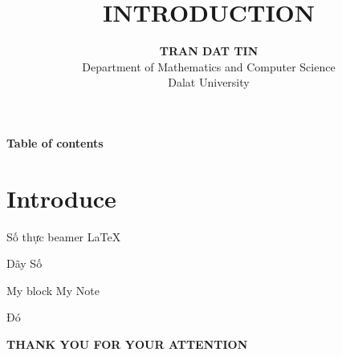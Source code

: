 \documentclass{beamer}
\title[]{\bf INTRODUCTION}
\author{\textbf{ TRAN DAT TIN}\\ Department of Mathematics and Computer Science \\ Dalat University}
\begin{document}

\begin{frame}
	\titlepage
\end{frame}

\begin{frame}{\bf Table of contents} 
	\tableofcontents
\end{frame}

\section{Introduce}

\begin{frame}{Số thực}
	beamer \pause
	\LaTeX \pause
\end{frame}

\begin{frame}[t]{Dãy Số}
	\begin{block}{My block}
	My Note
	\end{block}
	Đó\\
\end{frame}

\begin{frame}
	\centering \Large
	{\color{blue}\textbf{THANK YOU FOR YOUR ATTENTION}}
\end{frame}
\end{document}
